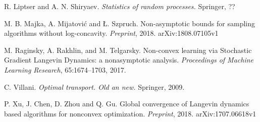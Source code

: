 \documentclass[a4paper,draft]{article}
\begin{document}
\begin{thebibliography}{00}
 R. Liptser and A. N. Shiryaev.
\newblock\emph{Statistics of random processes.}
\newblock Springer, ??

M. B. Majka, A. Mijatovi\'c and \L. Szpruch.
\newblock Non-asymptotic bounds for sampling algorithms
without log-concavity.
\newblock \emph{Preprint}, 2018. arXiv:1808.07105v1

M. Raginsky, A. Rakhlin, and M. Telgarsky.
\newblock Non-convex learning via Stochastic Gradient Langevin Dynamics: a nonasymptotic analysis.
\newblock \emph{Proceedings of Machine Learning Research}, 65:1674--1703, 2017. 

 C. Villani.
\newblock \emph{Optimal transport. Old an new.}
\newblock Springer, 2009.

 P. Xu, J. Chen, D. Zhou and Q. Gu.
\newblock Global convergence of Langevin dynamics based
algorithms for nonconvex optimization.
\newblock \emph{Preprint}, 2018. arXiv:1707.06618v1

\end{thebibliography}
\end{document}
